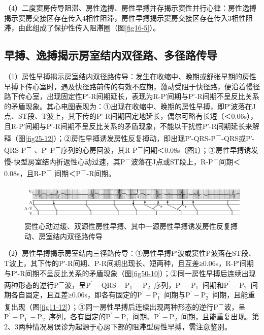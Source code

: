 （4）二度窦房传导阻滞、房性逸搏、房性早搏并存揭示窦性并行心律：房性逸搏揭示窦房交接区存在传入4相性阻滞，房性早搏揭示窦房交接区存在传入3相性阻滞，由此组成了保护性传入阻滞圈（图\ref{fig16-5}）。

\protect\hypertarget{text00043.htmlux5cux23subid468}{}{}

\subsection{早搏、逸搏揭示房室结内双径路、多径路传导}

（1）房性早搏揭示房室结内双径路传导：发生在收缩中、晚期或舒张早期的房性早搏下传心室时，遇及快径路前传的有效不应期，激动受阻于快径路，便沿着慢径路下传心室，出现固定性P′-R间期延长，表现为R-P′间期与P′-R间期不呈反比关系的矛盾现象。其心电图表现为：①出现在收缩中、晚期的房性早搏，即P′波落在J点、ST段、T波上，其下传的P′-R间期固定地延长，偶尔可略有长短（＜0.06s），且R-P′间期与P′-R间期不呈反比关系的矛盾现象，不能以干扰性P′-R间期延长来解释（图\ref{fig25-12}）；②房性早搏诱发房性反复搏动，即出现P′-QRS-P\textsuperscript{－}-QRS或P′-QRS-P\textsuperscript{－} 、P′-P\textsuperscript{－}序列的心房回波，其R-P\textsuperscript{－}间期＜0.08s（图\ref{fig36-5}）；③房性早搏诱发慢-快型房室结内折返性心动过速，其P\textsuperscript{－}波落在J点或ST段上，R-P\textsuperscript{－}间期＜0.08s，且R-P\textsuperscript{－} 间期＜P\textsuperscript{－}-R间期。

\begin{figure}[!htbp]
 \centering
 \includegraphics[width=5.78125in,height=0.6875in]{./images/Image00577.jpg}
 \captionsetup{justification=centering}
 \caption{窦性心动过缓、双源性房性早搏、其中一源房性早搏诱发房性反复搏动、房室结内双径路传导}
 \label{fig36-5}
  \end{figure} 

（2）房性早搏揭示房室结内三径路传导：①房性早搏P′波或窦性P波落在ST段、T波上，其下传的P′-R间期、P-R间期出现长、短两种，且互差≥0.06s，R-P′间期与P′-R间期不呈反比关系的矛盾现象（图\ref{fig50-10}）；②同一房性早搏后连续出现两种形态的逆行P\textsuperscript{－}波，呈$\text{P}^\prime-\text{QRS}-\text{P}_1^--\text{P}_2^-$
序列，$\text{P}^\prime-\text{P}_1^-$
间期和$\text{P}^\prime-\text{P}_2^-$
间期各自固定，且互差≥0.06s，即各有固定的$\text{P}^\prime-\text{P}_1^-$
间期与$\text{P}^\prime-\text{P}_2^-$
间期，且能重复出现（图\ref{fig11-12}）；③同一房性早搏后连续出现两种形态的逆行P\textsuperscript{－}波，呈$\text{P}^\prime-\text{P}_1^--\text{P}_2^-$
序列，各有固定的$\text{P}^\prime-\text{P}_1^-$
间期、$\text{P}^\prime-\text{P}_2^-$
间期，且能重复出现。第2、3两种情况易误诊为起源于心房下部的阻滞型房性早搏，需注意鉴别。


